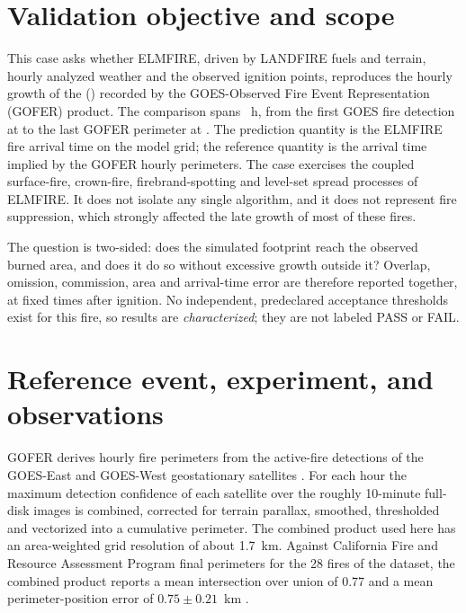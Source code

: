 \section{Validation objective and scope}

This case asks whether ELMFIRE, driven by LANDFIRE fuels and terrain, hourly
analyzed weather and the observed ignition points, reproduces the hourly growth
of the \FireName{} (\FireYear{}) recorded by the GOES-Observed Fire Event
Representation (GOFER) product.  The comparison spans \DurationHours{}~h, from
the first GOES fire detection at \EventStart{} to the last GOFER perimeter at
\EventEnd{}.  The prediction quantity is the ELMFIRE fire arrival time on the
model grid; the reference quantity is the arrival time implied by the GOFER
hourly perimeters.  The case exercises the coupled surface-fire, crown-fire,
firebrand-spotting and level-set spread processes of ELMFIRE.  It does not
isolate any single algorithm, and it does not represent fire suppression,
which strongly affected the late growth of most of these fires.

The question is two-sided: does the simulated footprint reach the observed
burned area, and does it do so without excessive growth outside it?  Overlap,
omission, commission, area and arrival-time error are therefore reported
together, at fixed times after ignition.  No independent, predeclared
acceptance thresholds exist for this fire, so results are
\emph{characterized}; they are not labeled PASS or FAIL.  \CalibrationNote{}

\section{Reference event, experiment, and observations}

\FireSummary{}  GOFER derives hourly fire perimeters from the active-fire
detections of the GOES-East and GOES-West geostationary satellites
\cite{liu2024gofer,liu2023goferdata}.  For each hour the maximum detection
confidence of each satellite over the roughly 10-minute full-disk images is
combined, corrected for terrain parallax, smoothed, thresholded and vectorized
into a cumulative perimeter.  The combined product used here has an
area-weighted grid resolution of about 1.7~km.  Against California Fire and
Resource Assessment Program final perimeters for the 28 fires of the dataset,
the combined product reports a mean intersection over union of 0.77 and a mean
perimeter-position error of $0.75\pm0.21$~km \cite{liu2024gofer}.

